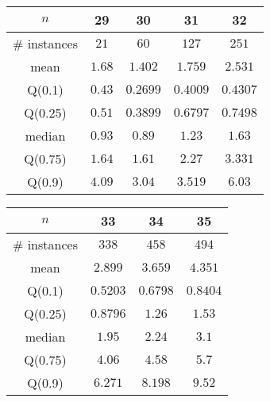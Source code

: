 \begin{tabular}{c|cccc} 
\hline 
$n$ & 29 & 30 & 31 & 32 \tabularnewline 
\hline 
\hline 
\# instances & $21$ & $60$ & $127$ & $251$ \tabularnewline 
mean & $1.68$ & $1.402$ & $1.759$ & $2.531$ \tabularnewline 
Q(0.1) & $0.43$ & $0.2699$ & $0.4009$ & $0.4307$ \tabularnewline 
Q(0.25) & $0.51$ & $0.3899$ & $0.6797$ & $0.7498$ \tabularnewline 
median & $0.93$ & $0.89$ & $1.23$ & $1.63$ \tabularnewline 
Q(0.75) & $1.64$ & $1.61$ & $2.27$ & $3.331$ \tabularnewline 
Q(0.9) & $4.09$ & $3.04$ & $3.519$ & $6.03$ \tabularnewline 
\hline 
\end{tabular} 
\medskip{} 

\begin{tabular}{c|ccc} 
\hline 
$n$ & 33 & 34 & 35 \tabularnewline 
\hline 
\hline 
\# instances & $338$ & $458$ & $494$ \tabularnewline 
mean & $2.899$ & $3.659$ & $4.351$ \tabularnewline 
Q(0.1) & $0.5203$ & $0.6798$ & $0.8404$ \tabularnewline 
Q(0.25) & $0.8796$ & $1.26$ & $1.53$ \tabularnewline 
median & $1.95$ & $2.24$ & $3.1$ \tabularnewline 
Q(0.75) & $4.06$ & $4.58$ & $5.7$ \tabularnewline 
Q(0.9) & $6.271$ & $8.198$ & $9.52$ \tabularnewline 
\hline 
\end{tabular} 
\medskip{} 

